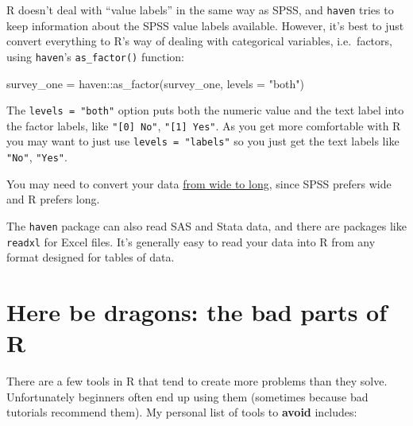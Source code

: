 \documentclass[
]{book}
\newenvironment{Shaded}{\begin{snugshade}}{\end{snugshade}}
\newcommand{\AttributeTok}[1]{\textcolor[rgb]{0.77,0.63,0.00}{#1}}
\newcommand{\FunctionTok}[1]{\textcolor[rgb]{0.00,0.00,0.00}{#1}}
\newcommand{\NormalTok}[1]{#1}
\newcommand{\OtherTok}[1]{\textcolor[rgb]{0.56,0.35,0.01}{#1}}
\newcommand{\SpecialCharTok}[1]{\textcolor[rgb]{0.00,0.00,0.00}{#1}}
\newcommand{\StringTok}[1]{\textcolor[rgb]{0.31,0.60,0.02}{#1}}
\begin{document}
R doesn't deal with ``value labels'' in the same way as SPSS, and
\texttt{haven} tries to keep information about the SPSS value labels available.
However, it's best to just convert everything to R's way of dealing with
categorical variables, i.e.~factors, using \texttt{haven}'s \texttt{as\_factor()} function:

\begin{Shaded}
\begin{Highlighting}[]
\NormalTok{survey\_one }\OtherTok{=}\NormalTok{ haven}\SpecialCharTok{::}\FunctionTok{as\_factor}\NormalTok{(survey\_one, }\AttributeTok{levels =} \StringTok{"both"}\NormalTok{)}
\end{Highlighting}
\end{Shaded}

The \texttt{levels\ =\ "both"} option puts both the numeric value and the text label
into the factor labels, like \texttt{"{[}0{]}\ No"}, \texttt{"{[}1{]}\ Yes"}. As you get more
comfortable with R you may want to just use \texttt{levels\ =\ "labels"} so you
just get the text labels like \texttt{"No"}, \texttt{"Yes"}.

You may need to convert your data \protect\hyperlink{wide-to-long}{from wide to long}, since
SPSS prefers wide and R prefers long.

The \texttt{haven} package can also read SAS and Stata data, and there are
packages like \texttt{readxl} for Excel files. It's generally easy to read
your data into R from any format designed for tables of data.

\hypertarget{here-be-dragons-the-bad-parts-of-r}{%
\section{Here be dragons: the bad parts of R}\label{here-be-dragons-the-bad-parts-of-r}}

There are a few tools in R that tend to create more problems
than they solve. Unfortunately beginners often end up using
them (sometimes because bad tutorials recommend them). My
personal list of tools to \textbf{avoid} includes:
\end{document}
